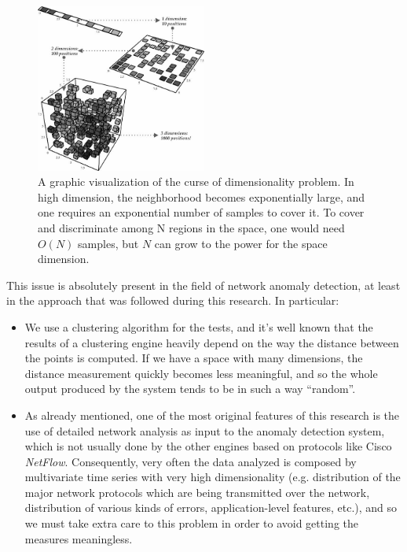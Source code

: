 \documentclass[12pt,a4paper,cucitura]{toptesi}
\begin{document}
\begin{figure}
\centering
\includegraphics[width=0.5\textwidth]{CurseDimensionality.jpg}
\caption[Curse of dimensionality]{A graphic visualization of the curse of dimensionality problem. In high dimension, the neighborhood becomes exponentially large, and one requires an exponential number of samples to cover it. To cover and discriminate among N regions in the space, one would need $O(N)$ samples, but $N$ can grow to the power for the space dimension.}
\end{figure}

This issue is absolutely present in the field of network anomaly detection, at least in the approach that was followed during this research. In particular:

\begin{itemize}
\item We use a clustering algorithm for the tests, and it's well known that the results of a clustering engine heavily depend on the way the distance between the points is computed. If we have a space with many dimensions, the distance measurement quickly becomes less meaningful, and so the whole output produced by the system tends to be in such a way ``random''.
\item As already mentioned, one of the most original features of this research is the use of detailed network analysis as input to the anomaly detection system, which is not usually done by the other engines based on protocols like Cisco \emph{NetFlow}. Consequently, very often the data analyzed is composed by multivariate time series with very high dimensionality (e.g. distribution of the major network protocols which are being transmitted over the network, distribution of various kinds of  errors, application-level features, etc.), and so we must take extra care to this problem in order to avoid getting the measures meaningless.
\end{itemize}
\end{document}
